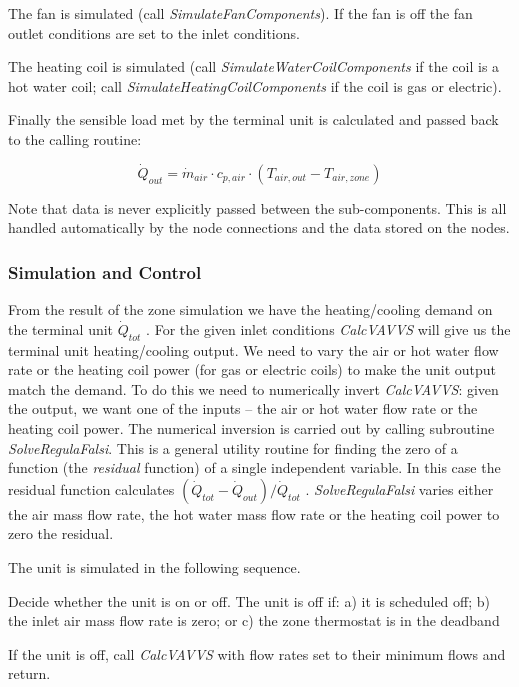 The fan is simulated (call \emph{SimulateFanComponents}). If the fan is off the fan outlet conditions are set to the inlet conditions.

The heating coil is simulated (call \emph{SimulateWaterCoilComponents} if the coil is a hot water coil; call \emph{SimulateHeatingCoilComponents} if the coil is gas or electric).

Finally the sensible load met by the terminal unit is calculated and passed back to the calling routine:

\begin{equation}
{\dot Q_{out}} = {\dot m_{air}}\cdot {c_{p,air}}\cdot ({T_{air,out}} - {T_{air,zone}})
\end{equation}

Note that data is never explicitly passed between the sub-components. This is all handled automatically by the node connections and the data stored on the nodes.

\subsubsection{Simulation and Control}\label{simulation-and-control-3}

From the result of the zone simulation we have the heating/cooling demand on the terminal unit \({\dot Q_{tot}}\) . For the given inlet conditions \emph{CalcVAVVS} will give us the terminal unit heating/cooling output. We need to vary the air or hot water flow rate or the heating coil power (for gas or electric coils) to make the unit output match the demand. To do this we need to numerically invert \emph{CalcVAVVS}: given the output, we want one of the inputs -- the air or hot water flow rate or the heating coil power. The numerical inversion is carried out by calling subroutine \emph{SolveRegulaFalsi}. This is a general utility routine for finding the zero of a function (the \emph{residual} function) of a single independent variable. In this case the residual function calculates \(({\dot Q_{tot}} - {\dot Q_{out}})/{\dot Q_{tot}}\) . \emph{SolveRegulaFalsi} varies either the air mass flow rate, the hot water mass flow rate or the heating coil power to zero the residual.

The unit is simulated in the following sequence.

Decide whether the unit is on or off. The unit is off if: a) it is scheduled off; b) the inlet air mass flow rate is zero; or c) the zone thermostat is in the deadband

If the unit is off, call \emph{CalcVAVVS} with flow rates set to their minimum flows and return.


